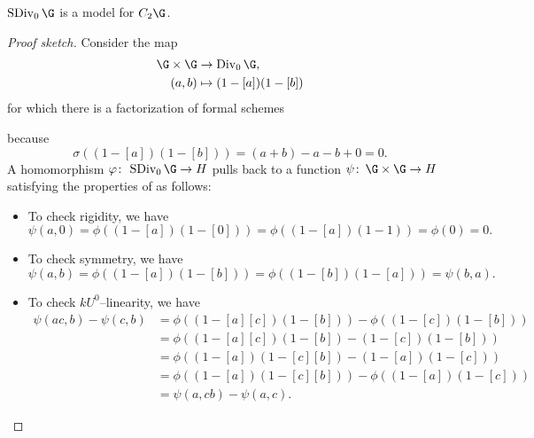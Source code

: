 \begin{theorem}\label{SDivModelsC2}
\(\SDiv_0 \G\) is a model for \(C_2 \G\).
\end{theorem}
\begin{proof}[Proof sketch]
Consider the map
\begin{align*}
\G \times \G & \to \Div_0 \G, \\
(a, b) & \mapsto (1 - [a])(1 - [b])
\end{align*}
for which there is a factorization of formal schemes
\begin{center}
\end{center}
because \[\sigma((1 - [a])(1 - [b])) = (a + b) - a - b + 0 = 0.\]  A homomorphism \(\phi\co \SDiv_0 \G \to H\) pulls back to a function \(\psi\co \G \times \G \to H\) satisfying the properties of  as follows:
\begin{itemize}
    \item To check rigidity, we have \[\psi(a, 0) = \phi((1 - [a])(1 - [0])) = \phi((1 - [a])(1 - 1)) = \phi(0) = 0.\]
    \item To check symmetry, we have \[\psi(a, b) = \phi((1 - [a])(1 - [b])) = \phi((1 - [b])(1 - [a])) = \psi(b, a).\]
    \item To check \(kU^0\)--linearity, we have
    \begin{align*}
    \psi(ac, b) - \psi(c, b) & = \phi((1 - [a][c])(1 - [b])) - \phi((1 - [c])(1 - [b])) \\
    & = \phi((1 - [a][c])(1 - [b]) - (1 - [c])(1 - [b])) \\
    & = \phi((1 - [a])(1 - [c][b]) - (1 - [a])(1 - [c])) \\
    & = \phi((1 - [a])(1 - [c][b])) - \phi((1 - [a])(1 - [c])) \\
    & = \psi(a, cb) - \psi(a, c).
    \end{align*}
\end{itemize}


\end{proof}
